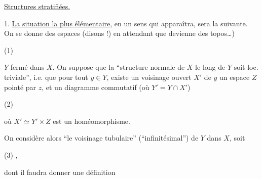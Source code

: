 
\uline{Structures stratifiées.}

1. \uline{La situation la plus élémentaire}, en un sens qui apparaîtra, sera la suivante. On se donne des espaces (disons !) en attendant que  devienne des topos\ldots)

(1)

$Y$ fermé dans $X$. On suppose que la ``structure normale de $X$ le long de $Y$ soit loc. triviale''\unsure{)}, i.e. que pour tout $y\in Y$, existe un voisinage ouvert $X'$ de $y$  un espace $Z$ pointé par $z$, et un diagramme commutatif (où $Y'=Y\cap X'$)

(2)

où $X'\simeq Y'\times Z$ est un homéomorphisme.

On considère alors ``le voisinage tubulaire'' (``infinitésimal'') de $Y$ dans $X$, soit

(3)
,

dont il faudra donner une définition

